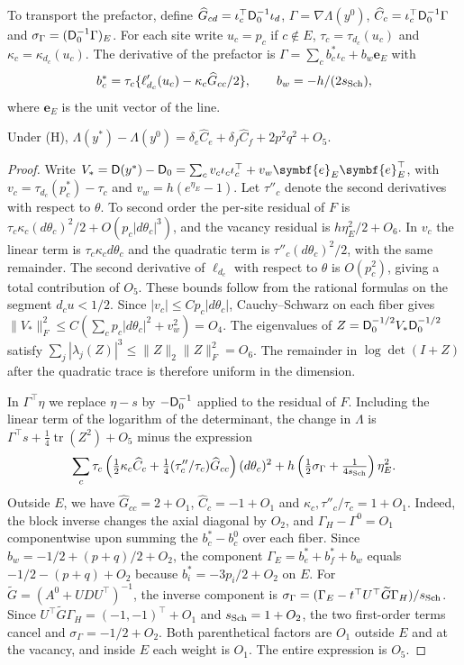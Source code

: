 To transport the prefactor, define $\widehat G_{cd}=\iota_c^\top \mathsf D_0^{-1}\iota_d$,
$\Gamma=\nabla\Lambda(y^0)$, $\widehat C_c=\iota_c^\top \mathsf D_0^{-1}\Gamma$ and
$\sigma_\Gamma=(\mathsf D_0^{-1}\Gamma)_E$. For each site write $u_c=p_c$ if $c\notin E$,
$\tau_c=\tau_{d_c}(u_c)$ and $\kappa_c=\kappa_{d_c}(u_c)$. The derivative of the prefactor is
$\Gamma=\sum_c b_c^*\iota_c+b_w\symbf{e}_E$ with
\[
 b_c^*=\tau_c\{\ell'_{d_c}(u_c)-\kappa_c\widehat G_{cc}/2\},\qquad b_w=-h/(2s_{\mathrm{Sch}}),
\]
where $\symbf{e}_E$ is the unit vector of the line.

\begin{lema}\label{lem:linea-traza}
Under (H), $\Lambda(y^*)-\Lambda(y^0)= \delta_e\widehat C_e+\delta_f\widehat C_f+2p^2q^2+O_5$.
\end{lema}
\begin{proof}
Write $V_*=\hessloc(y^*)-\hessloc_0=\sum_c v_c\iota_c\iota_c^\top
+v_w\symbf{e}_E\symbf{e}_E^\top$, with $v_c=\tau_{d_c}(p_c^*)-\tau_c$ and $v_w=h(e^{\eta_E}-1)$.
Let $\tau''_c$ denote the second derivatives with respect to $\theta$. To second order the
per-site residual of $F$ is $\tau_c\kappa_c(d\theta_c)^2/2+O(p_c|d\theta_c|^3)$, and the vacancy
residual is $h\eta_E^2/2+O_6$. In $v_c$ the linear term is $\tau_c\kappa_c d\theta_c$ and the
quadratic term is $\tau''_c(d\theta_c)^2/2$, with the same remainder. The second derivative of
$\ell_{d_c}$ with respect to $\theta$ is $O(p_c^2)$, giving a total contribution of $O_5$. These
bounds follow from the rational formulas on the segment $d_cu<1/2$. Since $|v_c|\le C
p_c|d\theta_c|$, Cauchy--Schwarz on each fiber gives $\|V_*\|_F^2\le C(\sum_c
p_c|d\theta_c|^2+v_w^2)=O_4$. The eigenvalues of $Z=\mathsf D_0^{-1/2}V_*\mathsf D_0^{-1/2}$ satisfy
$\sum_j|\lambda_j(Z)|^3\le\|Z\|_2\|Z\|_F^2=O_6$. The remainder in $\log\det(I+Z)$ after the
quadratic trace is therefore uniform in the dimension.

In $\Gamma^\top\eta$ we replace $\eta-s$ by $-\mathsf D_0^{-1}$ applied to the residual of $F$.
Including the linear term of the logarithm of the determinant, the change in $\Lambda$ is
$\Gamma^\top s+\tfrac14\operatorname{tr}(Z^2)+O_5$ minus the expression
\[
 \sum_c\tau_c\left(\tfrac12\kappa_c\widehat C_c+
 \tfrac14(\tau''_c/\tau_c)\widehat G_{cc}\right)(d\theta_c)^2
 +h\left(\tfrac12\sigma_\Gamma+\tfrac1{4s_{\mathrm{Sch}}}\right)\eta_E^2 .
\]
Outside $E$, we have $\widehat G_{cc}=2+O_1$, $\widehat C_c=-1+O_1$ and
$\kappa_c,\tau''_c/\tau_c=1+O_1$. Indeed, the block inverse changes the axial diagonal by $O_2$,
and $\Gamma_H-\Gamma^0=O_1$ componentwise upon summing the $b_c^*-b_c^0$ over each fiber. Since
$b_w=-1/2+(p+q)/2+O_2$, the component $\Gamma_E=b_e^*+b_f^*+b_w$ equals $-1/2-(p+q)+O_2$ because
$b_i^*=-3p_i/2+O_2$ on $E$. For $\widetilde G=(A^0+UDU^\top)^{-1}$, the inverse component is
$\sigma_\Gamma=(\Gamma_E-t^\top U^\top\widetilde G\Gamma_H)/s_{\mathrm{Sch}}$. Since $U^\top\widetilde
G\Gamma_H=(-1,-1)^\top+O_1$ and $s_{\mathrm{Sch}}=1+O_2$, the two first-order terms cancel and
$\sigma_\Gamma=-1/2+O_2$. Both parenthetical factors are $O_1$ outside $E$ and at the vacancy, and
inside $E$ each weight is $O_1$. The entire expression is $O_5$.


\end{proof}
